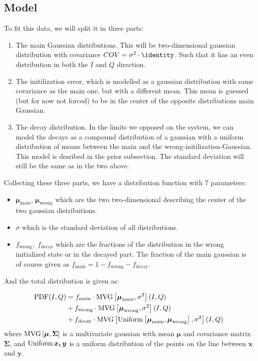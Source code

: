 \subsection{Model}
To fit this data, we will split it in three parts:
\begin{enumerate}
    \item The main Gaussian distributions. This will be two-dimensional gaussian distribution with covariance $COV = \sigma^2 \cdot \identity$. Such that it has an even distribution in both the $I$ and $Q$ direction.
    \item The initilization error, which is modelled as a gaussian distribution with same covariance as the main one, but with a different mean. This mean is guessed (but for now not forced) to be in the center of the opposite distributions main Gaussian.
    \item The decay distribution. In the limits we opposed on the system, we can model the decays as a compound distribution of a gaussian with a uniform distribution of means between the main and the wrong-initilization-Gaussian. This model is desribed in the prior subsection. The standard deviation will still be the same as in the two above.  
\end{enumerate}
\noindent
Collecting these three parts, we have a distribution function with 7 parameters:

\begin{itemize}
    \item $\boldsymbol{\mu}_{\text{main}}$, $\boldsymbol{\mu}_{\text{wrong}}$ which are the two two-dimensional describing the center of the two gaussian distributions.
    \item $\sigma$ which is the standard deviation of all distributions.
    \item $f_{\text{wrong}},\; f_{\text{decay}}$ which are the fractions of the distribution in the wrong initialized state or in the decayed part. The fraction of the main gaussian is of course given as $f_{\text{main}} = 1 - f_{\text{wrong}} -f_{\text{decay}}$.
\end{itemize}

\noindent
And the total distribution is given as:

\begin{align}
    \operatorname{PDF}(I, Q) &= f_{\text{main}} \cdot \operatorname{MVG}\left[\boldsymbol{\mu}_{\text{main}}, \sigma^2\right](I, Q) \label{eq:pdf_of_iq_plane_distribution} \\
               &+ f_{\text{wrong}} \cdot \operatorname{MVG}\left[\boldsymbol{\mu}_{\text{wrong}}, \sigma^2\right](I, Q) \nonumber \\
               &+ f_{\text{decay}} \cdot \operatorname{MVG}\left[\operatorname{Uniform}\left[\boldsymbol{\mu}_{\text{main}}, \boldsymbol{\mu}_{\text{wrong}}\right], \sigma^2 \right](I, Q) \nonumber
\end{align}
where $\operatorname{MVG}\left[\boldsymbol{\mu}, \boldsymbol{\Sigma} \right]$ is a multivariate gaussian with mean $\boldsymbol{\mu}$ and covariance matrix $\boldsymbol{\Sigma}$, and $\operatorname{Uniform}{\boldsymbol{x, y}}$ is a uniform distribution of the points on the line between $\boldsymbol{x}$ and $\boldsymbol{y}$.

